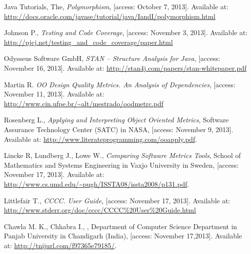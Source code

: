 \begin{thebibliography}{100}
	 Java Tutorials, The, {\em Polymorphism}, [access: October 7, 2013]. Available at: \\ \url{http://docs.oracle.com/javase/tutorial/java/IandI/polymorphism.html}	
	
	 Johnson P., {\em Testing and Code Coverage}, [access: November 3, 2013]. Available at: \url{http://pjcj.net/testing_and_code_coverage/paper.html} 

	 Odysseus Software GmbH, {\em STAN – Structure Analysis for Java}, [access: November 16, 2013]. Available at: \url{http://stan4j.com/papers/stan-whitepaper.pdf} 
 	
	 Martin R. {\em OO Design Quality Metrics. An Analysis of Dependencies}, [access: November 11, 2013]. Available at: \url{http://www.cin.ufpe.br/~alt/mestrado/oodmetrc.pdf}
	
	 Rosenberg L., {\em Applying and Interpreting Object Oriented Metrics}, Software Assurance Technology Center (SATC) in NASA, [access: November 9, 2013]. Available at: \url{http://www.literateprogramming.com/ooapply.pdf}.
 
  Lincke R, Lundberg J., Lowe W., {\em Comparing Software Metrics Tools}, School of Mathematics and Systems Engineering in Vaxjo University in Sweden, [access: November 17, 2013]. Available at: \url{http://www.cs.umd.edu/~pugh/ISSTA08/issta2008/p131.pdf}.
 
 Littlefair T., {\em CCCC. User Guide}, [access: November 17, 2013]. Available at: \url{http://www.stderr.org/doc/cccc/CCCC\%20User\%20Guide.html} 
 
 Chawla M. K., Chhabra I., {\em }, Department of Computer Science Department in Panjab University in Chandigarh (India), [access: November 17,2013]. Available at: \url{http://tnijurl.com/f97365e79185/}.
 
\end{thebibliography}